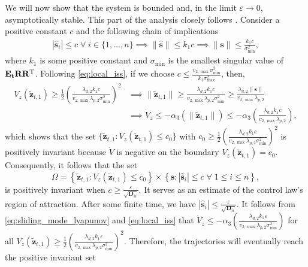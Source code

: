     We will now show that the system is bounded and, in the limit $\varepsilon \rightarrow 0$, asymptotically stable. This part of the analysis closely follows \cite[Theorem 14.1]{khalil_nonlinear_2002}. Consider a positive constant $c$ and the following chain of implications
    \begin{equation}
        \begin{split}
            |\hat{\mathbf{s}}_i| \leq c \;\forall\; i \in \{1,\ldots,n\} \implies \|\hat{\mathbf{s}}\| \leq k_1 c \implies \|\mathbf{s}\| \leq \frac{k_1 c}{\sigma_{\min}^2},
        \end{split}
    \end{equation}
    where $k_1$ is some positive constant and $\sigma_{\min}$ is the smallest singular value of $\mathbf{E_t R R^{\rm T}}$. Following \eqref{eq:local_iss}, if we choose $c \leq \frac{v_{2,\max} \sigma_{\min}^2}{k_1 \sigma_{\max}^2}$, then,
    \begin{equation}
    \begin{split}
        V_z(\tilde{\mathbf{z}}_{t,1}) \geq \frac{1}{2} \left(\frac{\lambda_{d,2}k_1 c}{v_{2,\max} \lambda_{p,2} \sigma_{\min}^2}\right)^2 &\implies \|\tilde{\mathbf{z}}_{t,1}\| \geq \frac{\lambda_{d,2}k_1 c}{v_{2,\max} \lambda_{p,2} \sigma_{\min}^2} \geq \frac{\lambda_{d,2}\|\mathbf{s}\|}{v_{2,\max} \lambda_{p,2}} \\
        &\implies \dot{V}_z \leq -\alpha_3(\|\tilde{\mathbf{z}}_{t,1}\|) \leq -\alpha_3\left(\frac{\lambda_{d,2}k_1 c}{v_{2,\max} \lambda_{p,2}}\right),   
    \end{split}
    \end{equation}
    which shows that the set $\{\tilde{\mathbf{z}}_{t,1} \colon V_z(\tilde{\mathbf{z}}_{t,1}) \leq c_0\}$ with $c_0 \geq \frac{1}{2} \left(\frac{\lambda_{d,2}k_1 c}{v_{2,\max} \lambda_{p,2} \sigma_{\min}^2}\right)^2$ is positively invariant because $\dot{V}$ is negative on the boundary $V_z(\tilde{\mathbf{z}}_{t,1}) = c_0$. Consequently, it follows that the set
    \begin{equation}\label{eq:Omega}
        \Omega = \left \{\tilde{\mathbf{z}}_{t,1} \colon V_z(\tilde{\mathbf{z}}_{t,1}) \leq c_0\right\} \times \left\{ \mathbf{s} \colon |\hat{\mathbf{s}}_i| \leq c \;\forall\; 1\leq i\leq n\right\},
    \end{equation}
    is positively invariant when $c \geq \frac{\varepsilon}{\sqrt{\mathbf{D}_{ii}}}$. It serves as an estimate of the control law's region of attraction. After some finite time, we have $|\hat{\mathbf{s}}_i| \leq \frac{\varepsilon}{\sqrt{\mathbf{D}_{ii}}}$. It follows from \eqref{eq:sliding_mode_lyapunov} and \eqref{eq:local_iss} that $\dot{V}_z \leq - \alpha_3\left(\frac{\lambda_{d,2} k_1 \varepsilon}{v_{2,\max} \lambda_{p,2} \sigma_{\min}^2}\right)$ for all $ V_z(\tilde{\mathbf{z}}_{t,1}) \geq \frac{1}{2} \left(\frac{\lambda_{d,2}k_1 \varepsilon}{v_{2,\max} \lambda_{p,2} \sigma_{\min}^2}\right)^2$. Therefore, the trajectories will eventually reach the positive invariant set
